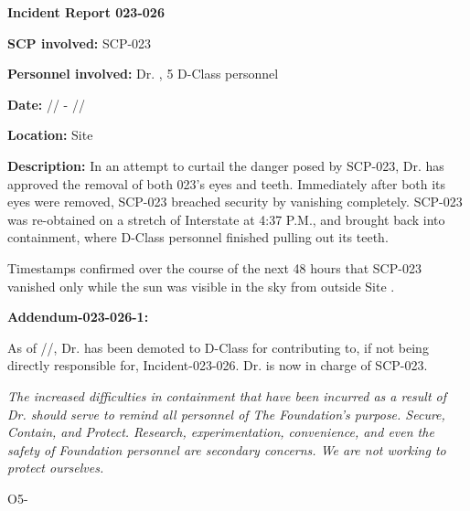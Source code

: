 \textbf{Incident Report 023-026}

\textbf{SCP involved:} SCP-023

\textbf{Personnel involved:} Dr. , 5 D-Class personnel

\textbf{Date:} // - //

\textbf{Location:} Site 

\textbf{Description:} In an attempt to curtail the danger posed by SCP-023, Dr.  has approved the removal of both 023's eyes and teeth. Immediately after both its eyes were removed, SCP-023 breached security by vanishing completely. SCP-023 was re-obtained on a stretch of Interstate  at 4:37 P.M., and brought back into containment, where D-Class personnel finished pulling out its teeth.

Timestamps confirmed over the course of the next 48 hours that SCP-023 vanished only while the sun was visible in the sky from outside Site .

\textbf{Addendum-023-026-1:}

As of //, Dr.  has been demoted to D-Class for contributing to, if not being directly responsible for, Incident-023-026. Dr.  is now in charge of SCP-023.

\textsl{The increased difficulties in containment that have been incurred as a result of Dr.  should serve to remind all personnel of The Foundation's purpose. Secure, Contain, and Protect. Research, experimentation, convenience, and even the safety of Foundation personnel are secondary concerns. We are not working to protect ourselves.}

O5-